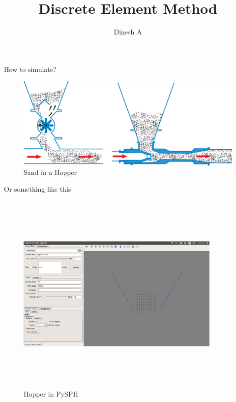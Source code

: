 \documentclass[pdf]
{beamer}
\title{Discrete Element Method}
\author{Dinesh A}
\begin{document}
\begin{frame}
\titlepage
\end{frame}


\begin{frame}{How to simulate?}

\begin{figure}[htbp]
\centerline{\includegraphics[]{hopper_real.png}}
\caption[]{Sand in a Hopper}
\end{figure}

\end{frame}


\begin{frame}{Or something like this}
\begin{figure}[htbp]
\centerline{\includegraphics[width=10cm,height=10cm,keepaspectratio]{pysph_dem.png}}
\caption[]{\label{fig:pysph_dem} Hopper in PySPH}
\end{figure}

\end{frame}
\end{document}
